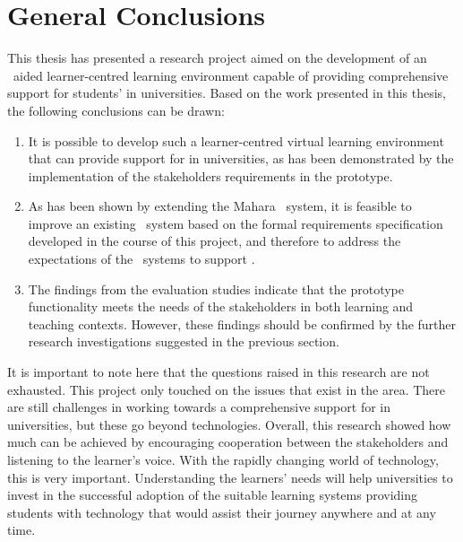 \section{General Conclusions}

This thesis has presented a research project aimed on the development of an
\ep~aided learner-centred learning environment capable of providing
comprehensive support for students' \LLLs in universities. Based on the work
presented in this thesis, the following conclusions can be drawn:
\begin{enumerate}
  \item It is possible to develop such a learner-centred virtual learning
  environment that can provide support for \LLLs in universities, as has been
  demonstrated by the implementation of the stakeholders requirements in the
  prototype.
  \item As has been shown by extending the Mahara \ep~system, it is feasible to
  improve an existing \ep~system based on the formal requirements specification
  developed in the course of this project, and therefore to address the
  expectations of the \ep~systems to support \LLLsn.
  \item The findings from the evaluation studies indicate that the prototype
  functionality meets the needs of the stakeholders in both learning and
  teaching contexts. However, these findings should be confirmed by the further
  research investigations suggested in the previous section.
\end{enumerate}

It is important to note here that the questions raised in this research are
not exhausted. This project only touched on the issues that exist in the area.
There are still challenges in working towards a comprehensive support for \LLLs
in universities, but these go beyond technologies. Overall, this research showed
how much can be achieved by encouraging cooperation between the stakeholders and
listening to the learner's voice. With the rapidly changing world of technology,
this is very important. Understanding the learners' needs will help universities
to invest in the successful adoption of the suitable learning systems providing
students with technology that would assist their \LLLs journey anywhere and at
any time.
